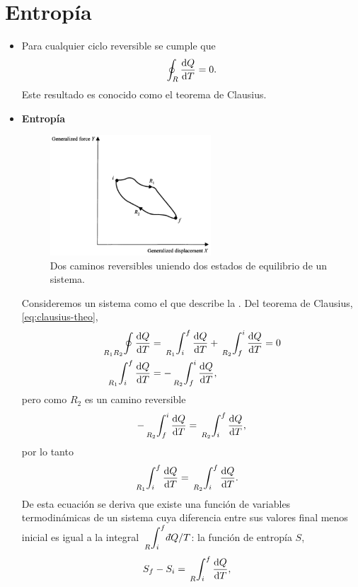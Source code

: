 \section{Entropía}
\begin{itemize}
\item Para cualquier ciclo reversible se cumple que
\begin{align}
\oint_R \dv{Q}{T}=0.
\label{eq:clausius-theo}
\end{align}
Este resultado es conocido como el teorema de Clausius.

\item \textbf{Entropía}
\begin{figure}
  \centering
  \includegraphics[width=6cm]{images/reversible-paths.png}
  \caption{Dos caminos reversibles uniendo dos estados de equilibrio
  de un sistema.}
  \label{fig:reversible-paths}
\end{figure}
Consideremos un sistema como el que describe la . 
Del teorema de Clausius, \eqref{eq:clausius-theo},
\begin{align*}
\sideset{_{R_1R_2}}{}\oint \dv{Q}{T}&=
\sideset{_{R_1}}{_i^f}\int \dv{Q}{T} 
+\sideset{_{R_2}}{_f^i}\int \dv{Q}{T}=0\\
\sideset{_{R_1}}{_i^f}\int \dv{Q}{T} &=-\sideset{_{R_2}}{_f^i}\int \dv{Q}{T},
\end{align*}
pero como $R_2$ es un camino reversible
\begin{align*}
-\sideset{_{R_2}}{_f^i}\int \dv{Q}{T} = \sideset{_{R_2}}{_i^f}\int \dv{Q}{T},
\end{align*}
por lo tanto 
\begin{align}
\sideset{_{R_1}}{_i^f}\int \dv{Q}{T} &=\sideset{_{R_2}}{_i^f}\int \dv{Q}{T}.
\end{align}
De esta ecuación se deriva que existe una función de variables 
termodinámicas de un sistema cuya diferencia entre sus 
valores final menos inicial es igual a la integral $\sideset{_R}{_i^f}\int
\dbar Q/T$: la función de entropía $S$,
\begin{align}
S_f-S_i&=
\sideset{_R}{_i^f}\int \dv{Q}{T},

\end{align}
\end{itemize}

